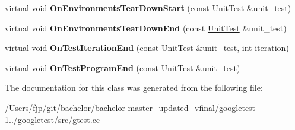 \begin{DoxyCompactItemize}
virtual void {\bfseries On\+Environments\+Tear\+Down\+Start} (const \mbox{\hyperlink{classtesting_1_1_unit_test}{Unit\+Test}} \&unit\+\_\+test)
\item 
\mbox{\label{classtesting_1_1internal_1_1_test_event_repeater_a8428220c4cf9f0cea2dfd9a70f07ab7f}} 
virtual void {\bfseries On\+Environments\+Tear\+Down\+End} (const \mbox{\hyperlink{classtesting_1_1_unit_test}{Unit\+Test}} \&unit\+\_\+test)
\item 
\mbox{\label{classtesting_1_1internal_1_1_test_event_repeater_a94253e3c11753328e8a031f39352708f}} 
virtual void {\bfseries On\+Test\+Iteration\+End} (const \mbox{\hyperlink{classtesting_1_1_unit_test}{Unit\+Test}} \&unit\+\_\+test, int iteration)
\item 
\mbox{\label{classtesting_1_1internal_1_1_test_event_repeater_a4622616259747dbcc23f5ee39ef99ec0}} 
virtual void {\bfseries On\+Test\+Program\+End} (const \mbox{\hyperlink{classtesting_1_1_unit_test}{Unit\+Test}} \&unit\+\_\+test)
\end{DoxyCompactItemize}


The documentation for this class was generated from the following file\+:\begin{DoxyCompactItemize}
\item 
/\+Users/fjp/git/bachelor/bachelor-\/master\+\_\+updated\+\_\+vfinal/googletest-\/1../googletest/src/gtest.\+cc\end{DoxyCompactItemize}
